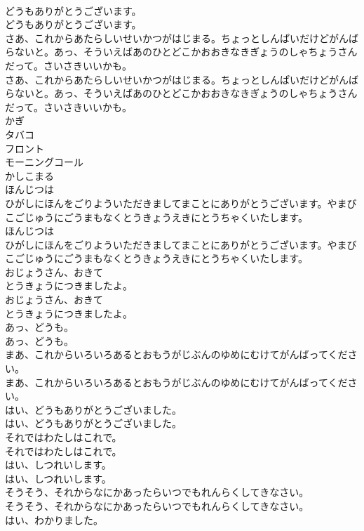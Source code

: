 \documentclass[8pt]{extreport}
\begin{document}
\begin{CJK}{UTF8}{min}
\\	どうもありがとうございます。
\\	どうもありがとうございます。
\\	さあ、これからあたらしいせいかつがはじまる。ちょっとしんぱいだけどがんばらないと。あっ、そういえばあのひとどこかおおきなきぎょうのしゃちょうさんだって。さいさきいいかも。
\\	さあ、これからあたらしいせいかつがはじまる。ちょっとしんぱいだけどがんばらないと。あっ、そういえばあのひとどこかおおきなきぎょうのしゃちょうさんだって。さいさきいいかも。
\\	かぎ
\\	タバコ
\\	フロント
\\	モーニングコール
\\	かしこまる
\\	ほんじつは
\\	ひがしにほんをごりよういただきましてまことにありがとうございます。やまびこごじゅうにごうまもなくとうきょうえきにとうちゃくいたします。
\\	ほんじつは
\\	ひがしにほんをごりよういただきましてまことにありがとうございます。やまびこごじゅうにごうまもなくとうきょうえきにとうちゃくいたします。
\\	おじょうさん、おきて
\\	とうきょうにつきましたよ。
\\	おじょうさん、おきて
\\	とうきょうにつきましたよ。
\\	あっ、どうも。
\\	あっ、どうも。
\\	まあ、これからいろいろあるとおもうがじぶんのゆめにむけてがんばってください。
\\	まあ、これからいろいろあるとおもうがじぶんのゆめにむけてがんばってください。
\\	はい、どうもありがとうございました。
\\	はい、どうもありがとうございました。
\\	それではわたしはこれで。
\\	それではわたしはこれで。
\\	はい、しつれいします。
\\	はい、しつれいします。
\\	そうそう、それからなにかあったらいつでもれんらくしてきなさい。
\\	そうそう、それからなにかあったらいつでもれんらくしてきなさい。
\\	はい、わかりました。

\end{CJK}
\end{document}
